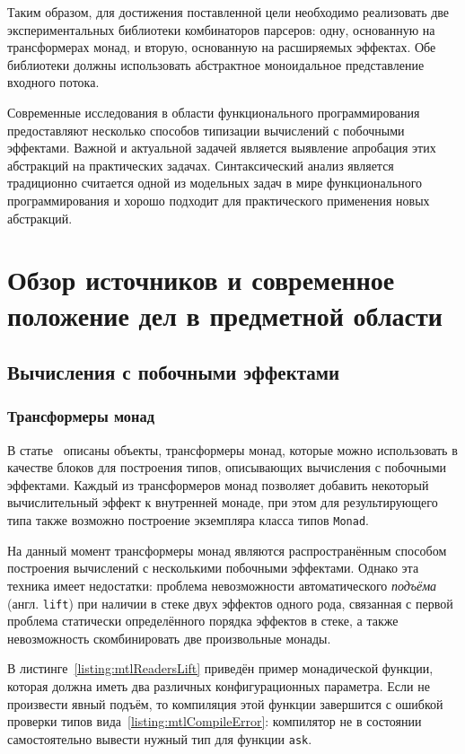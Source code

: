 Таким образом, для достижения поставленной цели необходимо реализовать две
экспериментальных библиотеки комбинаторов парсеров: одну, основанную на
трансформерах монад, и вторую, основанную на расширяемых эффектах. Обе библиотеки
должны использовать абстрактное моноидальное представление входного потока.

Современные исследования в области функционального программирования предоставляют
несколько способов  типизации вычислений с побочными эффектами. Важной и
актуальной задачей является выявление апробация этих абстракций на практических
задачах. Синтаксический анализ является традиционно считается одной из модельных
задач в мире функционального программирования и хорошо подходит для практического
применения новых абстракций.

\chapter{Обзор источников и современное положение дел в предметной области}

\section{Вычисления с побочными эффектами}

\subsection{Трансформеры монад}

В статье~\cite{monadTransformers} описаны объекты, трансформеры монад,
которые можно использовать в качестве блоков для построения типов, описывающих
вычисления с побочными эффектами. Каждый из трансформеров монад позволяет
добавить некоторый вычислительный эффект к внутренней монаде, при
этом для результирующего типа также возможно построение экземпляра класса
типов \lstinline{Monad}.

На данный момент трансформеры монад являются распространённым способом
построения вычислений с несколькими побочными эффектами. Однако эта
техника имеет недостатки: проблема невозможности автоматического
\emph{подъёма} (англ. \lstinline{lift}) при наличии в стеке двух эффектов одного
рода, связанная с первой проблема статически определённого порядка эффектов в
стеке, а также невозможность скомбинировать две произвольные монады.

В листинге~\ref{listing:mtlReadersLift} приведён пример монадической функции,
которая должна иметь два различных конфигурационных параметра. Если не
произвести явный подъём, то компиляция этой функции завершится с ошибкой
проверки типов вида~\ref{listing:mtlCompileError}: компилятор не в состоянии
самостоятельно вывести нужный тип для функции \lstinline{ask}.

